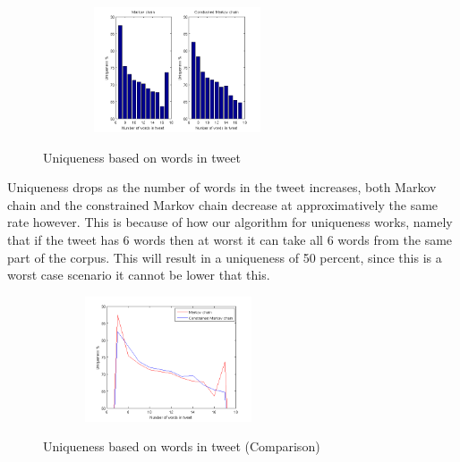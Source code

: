 \documentclass[a4paper,12pt]{article}
\begin{document}
\begin{figure}[h!]
  \hfill
  \begin{center}
  	{\includegraphics[width=300, height = 140]{UniqByNumWordsTweet.png}}
  \end{center}
  \caption{Uniqueness based on words in tweet}
 \end{figure}
 
 Uniqueness drops as the number of words in the tweet increases, both Markov chain and the constrained Markov chain decrease at  approximatively the same rate however. This is because of how our algorithm for uniqueness works, namely that if the tweet has 6 words then at worst it can take all 6 words from the same part of the corpus. This will result in a uniqueness of 50 percent, since this is a worst case scenario it cannot be lower that this.
 
 \begin{figure}[h!]
   \hfill
   \begin{center}
  	{\includegraphics[width=280, height = 140]{UniqByNumWordsTweet2.png}}
  \end{center}
  \hfill
  \caption{Uniqueness based on words in tweet (Comparison)}
 \end{figure}
 
\end{document}
